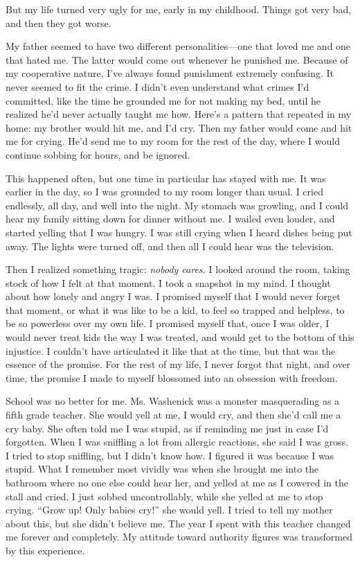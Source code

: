 But my life turned very ugly for me, early in my childhood. Things got very bad, and then they got worse.

My father seemed to have two different personalities---one that loved me and one that hated me. The latter would come out whenever he punished me. Because of my cooperative nature, I've always found punishment extremely confusing. It never seemed to fit the crime. I didn't even understand what crimes I'd committed, like the time he grounded me for not making my bed, until he realized he'd never actually taught me how. Here's a pattern that repeated in my home: my brother would hit me, and I'd cry. Then my father would come and hit me for crying. He'd send me to my room for the rest of the day, where I would continue sobbing for hours, and be ignored.

This happened often, but one time in particular has stayed with me. It was earlier in the day, so I was grounded to my room longer than usual. I cried endlessly, all day, and well into the night. My stomach was growling, and I could hear my family sitting down for dinner without me. I wailed even louder, and started yelling that I was hungry. I was still crying when I heard dishes being put away. The lights were turned off, and then all I could hear was the television.

Then I realized something tragic: \emph{nobody cares.} I looked around the room, taking stock of how I felt at that moment. I took a snapshot in my mind. I thought about how lonely and angry I was. I promised myself that I would never forget that moment, or what it was like to be a kid, to feel so trapped and helpless, to be so powerless over my own life. I promised myself that, once I was older, I would never treat kids the way I was treated, and would get to the bottom of this injustice. I couldn't have articulated it like that at the time, but that was the essence of the promise. For the rest of my life, I never forgot that night, and over time, the promise I made to myself blossomed into an obsession with freedom.

School was no better for me. Ms. Washenick was a monster masquerading as a fifth grade teacher. She would yell at me, I would cry, and then she'd call me a cry baby. She often told me I was stupid, as if reminding me just in case I'd forgotten. When I was sniffling a lot from allergic reactions, she said I was gross. I tried to stop sniffling, but I didn't know how. I figured it was because I was stupid. What I remember most vividly was when she brought me into the bathroom where no one else could hear her, and yelled at me as I cowered in the stall and cried. I just sobbed uncontrollably, while she yelled at me to stop crying. ``Grow up! Only babies cry!'' she would yell. I tried to tell my mother about this, but she didn't believe me. The year I spent with this teacher changed me forever and completely. My attitude toward authority figures was transformed by this experience.

